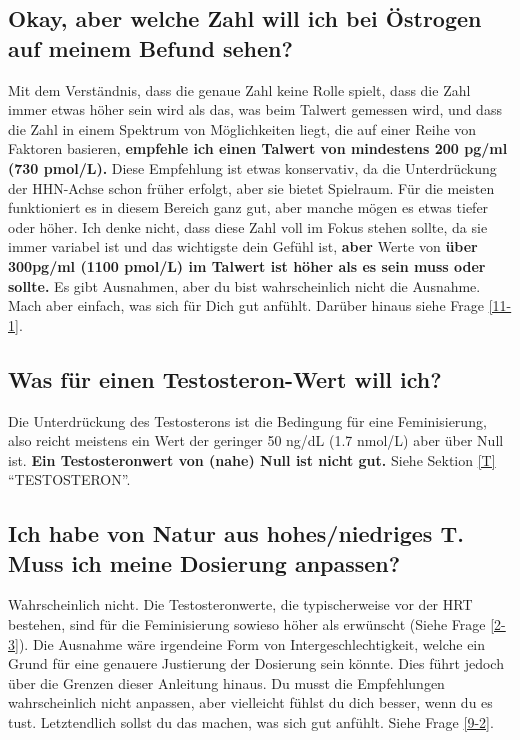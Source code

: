 \documentclass{article}
\begin{document}
\subsection{Okay, aber welche Zahl will ich bei Östrogen auf meinem Befund sehen?}

Mit dem Verständnis, dass die genaue Zahl keine Rolle spielt, dass die Zahl immer etwas höher sein wird als das, was beim Talwert gemessen wird, und dass die Zahl in einem Spektrum von Möglichkeiten liegt, die auf einer Reihe von Faktoren basieren, \textbf{empfehle ich einen Talwert von mindestens 200 pg/ml (730 pmol/L).} Diese Empfehlung ist etwas konservativ, da die Unterdrückung der HHN-Achse schon früher erfolgt, aber sie bietet Spielraum. Für die meisten funktioniert es in diesem Bereich ganz gut, aber manche mögen es etwas tiefer oder höher. Ich denke nicht, dass diese Zahl voll im Fokus stehen sollte, da sie immer variabel ist und das wichtigste dein Gefühl ist, \textbf{aber} Werte von \textbf{über 300pg/ml (1100 pmol/L) im Talwert ist höher als es sein muss oder sollte.} Es gibt Ausnahmen, aber du bist wahrscheinlich nicht die Ausnahme. Mach aber einfach, was sich für Dich gut anfühlt. Darüber hinaus siehe Frage \ref{11-1}.

\subsection{Was für einen Testosteron-Wert will ich?}

Die Unterdrückung des Testosterons ist die Bedingung für eine Feminisierung, also reicht meistens ein Wert der geringer 50 ng/dL (1.7 nmol/L) aber über Null ist. \textbf{Ein Testosteronwert von (nahe) Null ist nicht gut.} Siehe Sektion \ref{T} “TESTOSTERON”.

\subsection{Ich habe von Natur aus hohes/niedriges T. Muss ich meine Dosierung anpassen?}

Wahrscheinlich nicht. Die Testosteronwerte, die typischerweise vor der HRT bestehen, sind für die Feminisierung sowieso höher als erwünscht (Siehe Frage \ref{2-3}). Die Ausnahme wäre irgendeine Form von Intergeschlechtigkeit, welche ein Grund für eine genauere Justierung der Dosierung sein könnte. Dies führt jedoch über die Grenzen dieser Anleitung hinaus. Du musst die Empfehlungen wahrscheinlich nicht anpassen, aber vielleicht fühlst du dich besser, wenn du es tust. Letztendlich sollst du das machen, was sich gut anfühlt. Siehe Frage \ref{9-2}.
\end{document}
